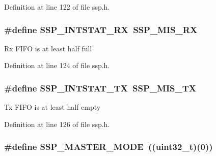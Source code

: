 Definition at line 122 of file ssp.\+h.

\subsubsection[{\texorpdfstring{S\+S\+P\+\_\+\+I\+N\+T\+S\+T\+A\+T\+\_\+\+RX}{SSP_INTSTAT_RX}}]{\setlength{\rightskip}{0pt plus 5cm}\#define S\+S\+P\+\_\+\+I\+N\+T\+S\+T\+A\+T\+\_\+\+RX~{\bf S\+S\+P\+\_\+\+M\+I\+S\+\_\+\+RX}}\hypertarget{group___s_s_p___public___macros_gacf36c76c863756c8bfda4057637cc034}{}\label{group___s_s_p___public___macros_gacf36c76c863756c8bfda4057637cc034}
Rx F\+I\+FO is at least half full 

Definition at line 124 of file ssp.\+h.

\subsubsection[{\texorpdfstring{S\+S\+P\+\_\+\+I\+N\+T\+S\+T\+A\+T\+\_\+\+TX}{SSP_INTSTAT_TX}}]{\setlength{\rightskip}{0pt plus 5cm}\#define S\+S\+P\+\_\+\+I\+N\+T\+S\+T\+A\+T\+\_\+\+TX~{\bf S\+S\+P\+\_\+\+M\+I\+S\+\_\+\+TX}}\hypertarget{group___s_s_p___public___macros_ga76c22817987e49834f2280f48c7b3c64}{}\label{group___s_s_p___public___macros_ga76c22817987e49834f2280f48c7b3c64}
Tx F\+I\+FO is at least half empty 

Definition at line 126 of file ssp.\+h.

\subsubsection[{\texorpdfstring{S\+S\+P\+\_\+\+M\+A\+S\+T\+E\+R\+\_\+\+M\+O\+DE}{SSP_MASTER_MODE}}]{\setlength{\rightskip}{0pt plus 5cm}\#define S\+S\+P\+\_\+\+M\+A\+S\+T\+E\+R\+\_\+\+M\+O\+DE~(({\bf uint32\+\_\+t})(0))}\hypertarget{group___s_s_p___public___macros_ga3c9cbd4f4b8169253d26f4d40cdc414d}{}\label{group___s_s_p___public___macros_ga3c9cbd4f4b8169253d26f4d40cdc414d}


